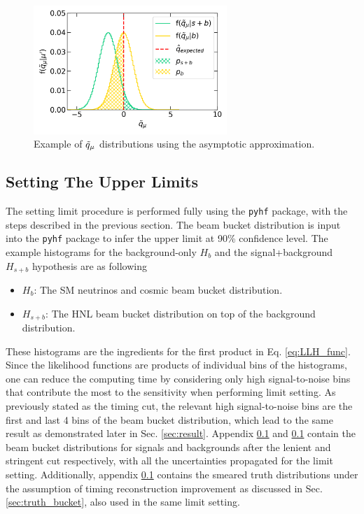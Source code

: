 \begin{figure}[hp!] 
\centering    
\includegraphics[width=0.65\textwidth]{asymtotic}
\caption[stat_asymptotic]{Example of $\Tilde{q}_\mu$ distributions using the asymptotic approximation.}
\label{fig:stat_asymptotic}
\end{figure}

\subsection{Setting The Upper Limits}

The setting limit procedure is performed fully using the \texttt{pyhf} package, with the steps described in the previous section.
The beam bucket distribution is input into the \texttt{pyhf} package to infer the upper limit at 90\% confidence level.
The example histograms for the background-only $H_{b}$ and the signal+background $H_{s+b}$ hypothesis are as following
\begin{itemize}
    \item $H_b$: The SM neutrinos and cosmic beam bucket distribution.
    \item $H_{s+b}$: The HNL beam bucket distribution on top of the background distribution. 
\end{itemize}

These histograms are the ingredients for the first product in Eq. \ref{eq:LLH_func}.
Since the likelihood functions are products of individual bins of the histograms, one can reduce the computing time by considering only high signal-to-noise bins that contribute the most to the sensitivity when performing limit setting. 
As previously stated as the timing cut, the relevant high signal-to-noise bins are the first and last 4 bins of the beam bucket distribution, which lead to the same result as demonstrated later in Sec. \ref{sec:result}.
Appendix \ref{} and \ref{} contain the beam bucket distributions for signals and backgrounds after the lenient and stringent cut respectively, with all the uncertainties propagated for the limit setting.
Additionally, appendix \ref{} contains the smeared truth distributions under the assumption of timing reconstruction improvement as discussed in Sec. \ref{sec:truth_bucket}, also used in the same limit setting.

